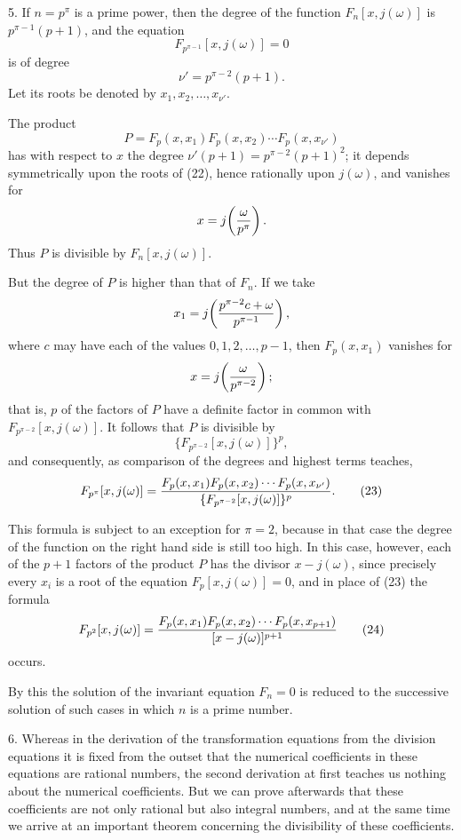 \documentclass[11pt]{article}
\begin{document}
5. If $n=p^\pi$ is a prime power, then the degree of the function $F_n[x,j(\omega)]$ is $p^{\pi-1}(p+1)$, and the equation
\begin{equation}
F_{p^{\pi-1}}[x,j(\omega)]=0
\tag{22}
\end{equation}
is of degree
\[
\nu'=p^{\pi-2}(p+1).
\]
Let its roots be denoted by $x_1,x_2,\ldots,x_{\nu'}$.

The product
\[
P=F_p(x,x_1)F_p(x,x_2)\cdots F_p(x,x_{\nu'})
\]
has with respect to $x$ the degree $\nu'(p+1)=p^{\pi-2}(p+1)^2$; it depends symmetrically upon the roots of (22), hence rationally upon $j(\omega)$, and vanishes for
\[
x=j\!\left({\omega\over p^\pi}\right).
\]
Thus $P$ is divisible by $F_n[x,j(\omega)]$.

But the degree of $P$ is higher than that of $F_n$. If we take
\[
x_1=j\!\left({p^{\pi-2}c+\omega\over p^{\pi-1}}\right),
\]
where $c$ may have each of the values $0,1,2,\ldots,p-1$, then $F_p(x,x_1)$ vanishes for
\[
x=j\!\left({\omega\over p^{\pi-2}}\right);
\]
that is, $p$ of the factors of $P$ have a definite factor in common with $F_{p^{\pi-2}}[x,j(\omega)]$. It follows that $P$ is divisible by
\[
\{F_{p^{\pi-2}}[x,j(\omega)]\}^p,
\]
and consequently, as comparison of the degrees and highest terms teaches,
\begin{equation}
F_{p^\pi}[x,j(\omega)]={F_p(x,x_1)F_p(x,x_2)\cdots F_p(x,x_{\nu'})\over
\{F_{p^{\pi-2}}[x,j(\omega)]\}^p}.
\tag{23}
\end{equation}

This formula is subject to an exception for $\pi=2$, because in that case the degree of the function on the right hand side is still too high. In this case, however, each of the $p+1$ factors of the product $P$ has the divisor $x-j(\omega)$, since precisely every $x_i$ is a root of the equation $F_p[x,j(\omega)]=0$, and in place of (23) the formula
\begin{equation}
F_{p^2}[x,j(\omega)]={F_p(x,x_1)F_p(x,x_2)\cdots F_p(x,x_{p+1})
\over [x-j(\omega)]^{p+1}}
\tag{24}
\end{equation}
occurs.

By this the solution of the invariant equation $F_n=0$ is reduced to the successive solution of such cases in which $n$ is a prime number.

6. Whereas in the derivation of the transformation equations from the division equations it is fixed from the outset that the numerical coefficients in these equations are rational numbers, the second derivation at first teaches us nothing about the numerical coefficients. But we can prove afterwards that these coefficients are not only rational but also integral numbers, and at the same time we arrive at an important theorem concerning the divisibility of these coefficients.
\end{document}
